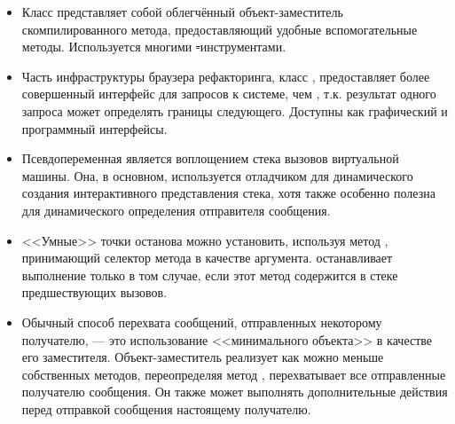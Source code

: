 \documentclass[a4paper,10pt,twoside]{book}
\begin{document}
\begin{itemize}
\item Класс  представляет собой облегчённый объект-заместитель скомпилированного метода, предоставляющий удобные вспомогательные методы. Используется многими \st-инструментами.
\item Часть инфраструктуры браузера рефакторинга, класс , предоставляет более совершенный интерфейс для запросов к системе, чем , т.к. результат одного запроса может определять границы следующего. Доступны как графический и программный интерфейсы.
\item Псевдопеременная  является воплощением стека вызовов виртуальной машины. Она, в основном, используется отладчиком для динамического создания интерактивного представления стека, хотя также особенно полезна для динамического определения отправителя сообщения.
\item <<Умные>> точки останова можно установить, используя метод , принимающий селектор метода в качестве аргумента.  останавливает выполнение только в том случае, если этот метод содержится в стеке предшествующих вызовов.
\item Обычный способ перехвата сообщений, отправленных некоторому получателю, --- это использование <<минимального объекта>> в качестве его заместителя. Объект-заместитель реализует как можно меньше собственных методов, переопределяя метод , перехватывает все отправленные получателю сообщения. Он также может выполнять дополнительные действия перед отправкой сообщения настоящему получателю.

\end{itemize}
\end{document}
